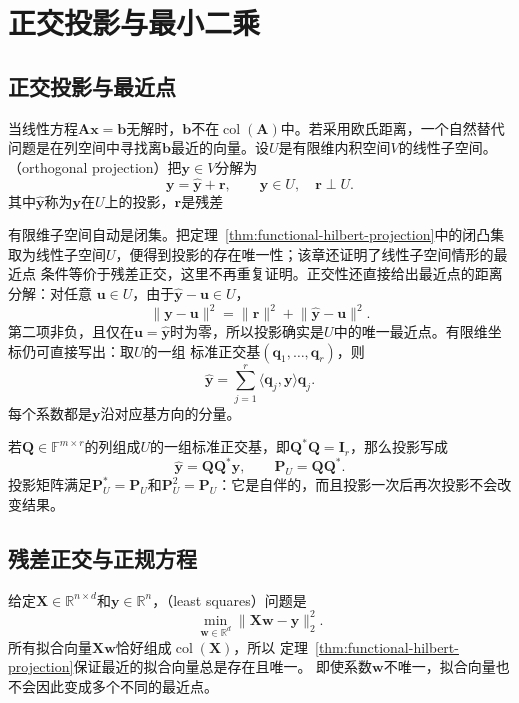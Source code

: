 \section{正交投影与最小二乘}
\label{sec:linear-algebra-projection-least-squares}

\subsection{正交投影与最近点}

当线性方程$\bm{A}\bm{x}=\bm{b}$无解时，$\bm{b}$不在$\operatorname{col}(\bm{A})$中。若采用欧氏距离，一个自然替代问题是在列空间中寻找离$\bm{b}$最近的向量。设$U$是有限维内积空间$V$的线性子空间。（orthogonal projection）把$\bm{y}\in V$分解为
\[
  \bm{y}
  =
  \widehat{\bm{y}}+\bm{r},
  \qquad
  \widehat{\bm{y}}\in U,
  \quad
  \bm{r}\perp U.
\]
其中$\widehat{\bm{y}}$称为$\bm{y}$在$U$上的投影，$\bm{r}$是残差

有限维子空间自动是闭集。把定理~\ref{thm:functional-hilbert-projection}中的闭凸集
取为线性子空间$U$，便得到投影的存在唯一性；该章还证明了线性子空间情形的最近点
条件等价于残差正交，这里不再重复证明。正交性还直接给出最近点的距离分解：对任意
$\bm{u}\in U$，由于$\widehat{\bm{y}}-\bm{u}\in U$，
\[
  \lVert\bm{y}-\bm{u}\rVert^2
  =
  \lVert\bm{r}\rVert^2
  +
  \lVert\widehat{\bm{y}}-\bm{u}\rVert^2.
\]
第二项非负，且仅在$\bm{u}=\widehat{\bm{y}}$时为零，所以投影确实是$U$中的唯一最近点。有限维坐标仍可直接写出：取$U$的一组
标准正交基$(\bm{q}_1,\ldots,\bm{q}_r)$，则
\[
  \widehat{\bm{y}}
  =
  \sum_{j=1}^{r}
  \langle\bm{q}_j,\bm{y}\rangle\bm{q}_j.
\]
每个系数都是$\bm{y}$沿对应基方向的分量。

若$\bm{Q}\in\mathbb{F}^{m\times r}$的列组成$U$的一组标准正交基，即$\bm{Q}^{*}\bm{Q}=\bm{I}_r$，那么投影写成
\begin{equation}
  \widehat{\bm{y}} = \bm{Q}\bm{Q}^{*}\bm{y}, \qquad \bm{P}_U=\bm{Q}\bm{Q}^{*}. \label{eq:linear-algebra-orthogonal-projector}
\end{equation}
投影矩阵满足$\bm{P}_U^{*}=\bm{P}_U$和$\bm{P}_U^2=\bm{P}_U$：它是自伴的，而且投影一次后再次投影不会改变结果。

\subsection{残差正交与正规方程}

给定$\bm{X}\in\mathbb{R}^{n\times d}$和$\bm{y}\in\mathbb{R}^n$，（least squares）问题是
\begin{equation}
  \min_{\bm{w}\in\mathbb{R}^d} \lVert\bm{X}\bm{w}-\bm{y}\rVert_2^2. \label{eq:linear-algebra-least-squares}
\end{equation}
所有拟合向量$\bm{X}\bm{w}$恰好组成$\operatorname{col}(\bm{X})$，所以
定理~\ref{thm:functional-hilbert-projection}保证最近的拟合向量总是存在且唯一。
即使系数$\bm{w}$不唯一，拟合向量也不会因此变成多个不同的最近点。

